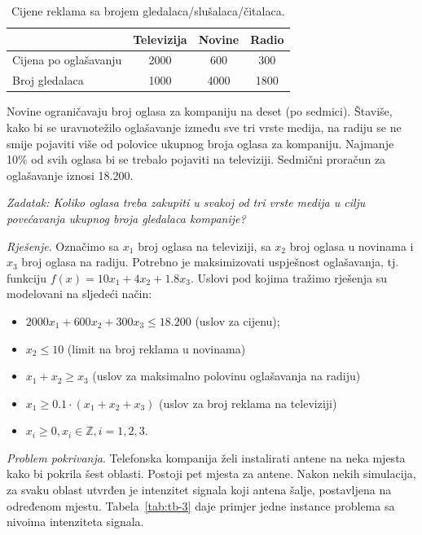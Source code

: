 \documentclass[a4paper, utf8, 11pt, colorlinks]{article}
\begin{document}
\begin{table}[!ht]
    \centering
    \begin{tabular}{l|c|c|c} \hline
                 \                  & Televizija & Novine & Radio  \\ \hline
         Cijena po oglašavanju      & 2000       & 600    & 300    \\
         Broj gledalaca             & 1000      & 4000  & 1800 \\ \hline
    \end{tabular}
    \caption{Cijene reklama sa brojem gledalaca/slušalaca/čitalaca.}
    \label{tab:tab_model_advertising}
\end{table}

Novine ograničavaju broj oglasa za kompaniju na deset (po sedmici). Štaviše, kako bi se uravnotežilo oglašavanje između sve tri vrste medija, na radiju se ne smije pojaviti više od polovice ukupnog broja oglasa za kompaniju. Najmanje 10\% od svih oglasa bi se trebalo pojaviti na televiziji. Sedmični proračun za oglašavanje iznosi 18.200. 

\emph{Zadatak: Koliko oglasa treba zakupiti u svakoj od tri vrste medija u cilju povećavanja ukupnog broja gledalaca kompanije?}

\emph{Rješenje}.   Označimo sa $x_1$ broj oglasa na televiziji, sa $x_2$ broj oglasa u novinama i $x_3$ broj oglasa na radiju. Potrebno je maksimizovati   uspješnost oglašavanja, tj. funkciju 
$f(x) = 10 x_1 + 4 x_2 + 1.8 x_3.$ Uslovi pod kojima tražimo rješenja su modelovani na sljedeći način:
\begin{itemize}
    \item $2000 x_1 + 600 x_2 + 300 x_3 \leq 18.200$ (uslov za cijenu);
    \item  $ x_2 \leq 10$ (limit na broj reklama u novinama)
    \item $x_1 + x_2 \geq x_3$ (uslov za maksimalno polovinu oglašavanja na radiju) 
    \item ${x_1}\geq 0.1\cdot (x_1 + x_2 + x_3)$ (uslov za broj reklama na televiziji)
    \item $x_i \geq 0, x_i \in \mathbb{Z}, i=1,2,3$.
\end{itemize}
\emph{Problem pokrivanja}. Telefonska kompanija želi instalirati antene na neka mjesta kako bi pokrila šest oblasti. Postoji pet mjesta za antene. Nakon nekih simulacija, za svaku oblast utvrđen je intenzitet signala koji antena šalje, postavljena na određenom mjestu. Tabela~\ref{tab:tb-3} daje   primjer jedne instance problema sa nivoima intenziteta signala.
\end{document}
